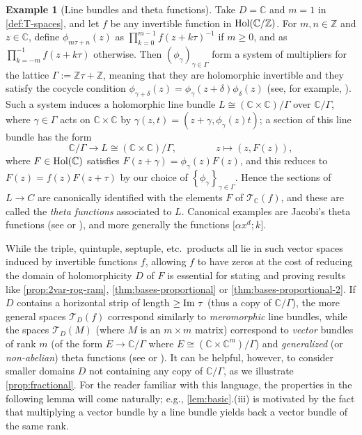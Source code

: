 \documentclass[reqno,11pt]{amsart}
\theoremstyle{definition}
\newtheorem{example}[theorem]{Example}
\theoremstyle{remark}
\numberwithin{equation}{section}
\newcommand{\Z}{\mathbb{Z}}
\newcommand{\C}{\mathbb{C}}
\newcommand{\mT}{\mathcal{T}}
\renewcommand{\Im}{\textnormal{Im}\ }
\newcommand{\Hol}{\textnormal{Hol}}
\newcommand{\vect}[2]{\big[{#1};{#2}\big]}
\newcommand{\fix}[1]{\textcolor{blue}{\large (#1)\normalsize}}
\begin{document}
\begin{example}[Line bundles and theta functions]
Take $D = \C$ and $m = 1$ in \cref{def:T-spaces}, and let $f$ be any invertible function in $\Hol(\C/\Z)$. For $m, n \in \Z$ and $z \in \C$, define $\phi_{m\tau + n}(z)$ as $\prod_{k=0}^{m-1} f(z+k\tau)^{-1}$ if $m \ge 0$, and as $\prod_{k=-m}^{-1} f(z+k\tau)$ otherwise. Then $(\phi_\gamma)_{\gamma \in \Gamma}$ form a system of multipliers for the lattice $\Gamma := \Z\tau + \Z$, meaning that they are holomorphic invertible and they satisfy the cocycle condition $\phi_{\gamma+ \delta}(z) = \phi_\gamma(z+\delta) \phi_\delta(z)$ (see, for example, \cite[\S 2.3]{beauville2013theta}). Such a system induces a holomorphic line bundle $L \cong (\C \times \C)/\Gamma$ over $\C/\Gamma$, where $\gamma \in \Gamma$ acts on $\C \times \C$ by $\gamma(z, t) = (z + \gamma, \phi_\gamma(z)t)$; a section of this line bundle has the form \[
    \C/\Gamma \to L \cong \left(\C \times \C\right)/\Gamma, 
    \qquad\qquad 
    z \mapsto (z, F(z)),
\]
where $F \in \Hol(\C)$ satisfies $F(z + \gamma) = \phi_\gamma(z) F(z)$, and this reduces to $F(z) = f(z)F(z+\tau)$ by our choice of $\left\{\phi_\gamma\right\}_{\gamma \in \Gamma}$. Hence the sections of $L \to C$ are canonically identified with the elements $F$ of $\mT_\C(f)$, and these are called the \emph{theta functions} associated to $L$. Canonical examples are Jacobi's theta functions (see \cite{jacobi1829fundamenta} or \cite[p.~464]{whittaker2020course}), and more generally the functions $\vect{\alpha x^d}{k}$.

While the triple, quintuple, septuple, etc.\ products all lie in such vector spaces induced by invertible functions $f$, allowing $f$ to have zeros at the cost of reducing the domain of holomorphicity $D$ of $F$ is essential for stating and proving results like \cref{prop:2var-rog-ram}, \cref{thm:bases-proportional} or \cref{thm:bases-proportional-2}. If $D$ contains a horizontal strip of length $\ge \Im \tau$ (thus a copy of $\C/\Gamma$), the more general spaces $\mT_D(f)$ correspond similarly to \emph{meromorphic} line bundles, while the spaces $\mT_D(M)$ (where $M$ is an $m \times m$ matrix) correspond to \emph{vector} bundles of rank $m$ (of the form $E \to \C/\Gamma$ where $E \cong \left(\C \times \C^m\right)/\Gamma$) and \emph{generalized} (or \emph{non-abelian}) theta functions (see \cite[\S 6.2]{beauville2013theta} or \cite{gunning1982generalized}). It can be helpful, however, to consider smaller domains $D$ not containing any copy of $\C/\Gamma$, as we illustrate \cref{prop:fractional}.
For the reader familiar with this language, the properties in the following lemma will come naturally; e.g., \cref{lem:basic}.(iii) is motivated by the fact that multiplying a vector bundle by a line bundle yields back a vector bundle of the same rank.
\end{example}
\end{document}
